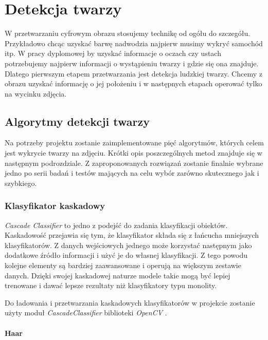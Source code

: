 \newpage

\section{Detekcja twarzy} \label{section:face_detection}

W przetwarzaniu cyfrowym obrazu stosujemy technikę od ogółu do szczegółu. Przykładowo chcąc uzyskać barwę nadwodzia najpierw musimy wykryć samochód itp. W pracy dyplomowej by uzyskać informacje o oczach czy ustach potrzebujemy najpierw informacji o wystąpieniu twarzy i gdzie się ona znajduje. Dlatego pierwszym etapem przetwarzania jest detekcja ludzkiej twarzy. Chcemy z obrazu uzyskać informację o jej położeniu i w następnych etapach operować tylko na wycinku zdjęcia. 

\subsection{Algorytmy detekcji twarzy}

Na potrzeby projektu zostanie zaimplementowane pięć algorytmów, których celem jest wykrycie twarzy na zdjęciu. Krótki opis poszczególnych metod znajduje się w następnym podrozdziale. Z zaproponowanych rozwiązań zostanie finalnie wybrane jedno po serii badań i testów mających na celu wybór zarówno skutecznego jak i szybkiego.

\subsubsection{Klasyfikator kaskadowy} \label{section:face_casacde_classifier}
\textit{Cascade Classifier} to jedno z podejść do zadania klasyfikacji obiektów. Kaskadowość przejawia się tym, że klasyfikator składa się z łańcucha mniejszych klasyfikatorów. Z danych wejściowych jednego może korzystać następnym jako dodatkowe źródło informacji i użyć je do własnej klasyfikacji. Z tego powodu kolejne elementy są bardziej zaawansowane i operują na większym zestawie danych. Dzięki swojej kaskadowej naturze modele takie mogą być lepiej trenowane i dawać lepsze rezultaty niż klasyfikatory typu monolity.

\vspace{5mm}

Do ładowania i przetwarzania kaskadowych klasyfikatorów w projekcie zostanie użyty moduł \textit{CascadeClassifier} \cite{cascade_opencv} biblioteki \textit{OpenCV} \cite{opencv}. 

\paragraph{Haar}

